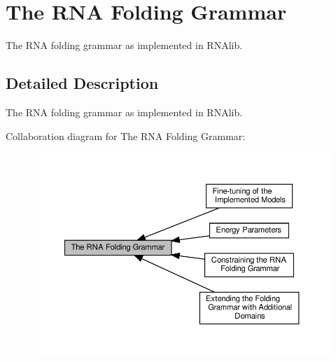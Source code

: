 \hypertarget{group__grammar}{}\section{The R\+NA Folding Grammar}
\label{group__grammar}


The R\+NA folding grammar as implemented in R\+N\+Alib.  




\subsection{Detailed Description}
The R\+NA folding grammar as implemented in R\+N\+Alib. 

Collaboration diagram for The R\+NA Folding Grammar\+:
\nopagebreak
\begin{figure}[H]
\begin{center}
\leavevmode
\includegraphics[width=350pt]{group__grammar}
\end{center}
\end{figure}
